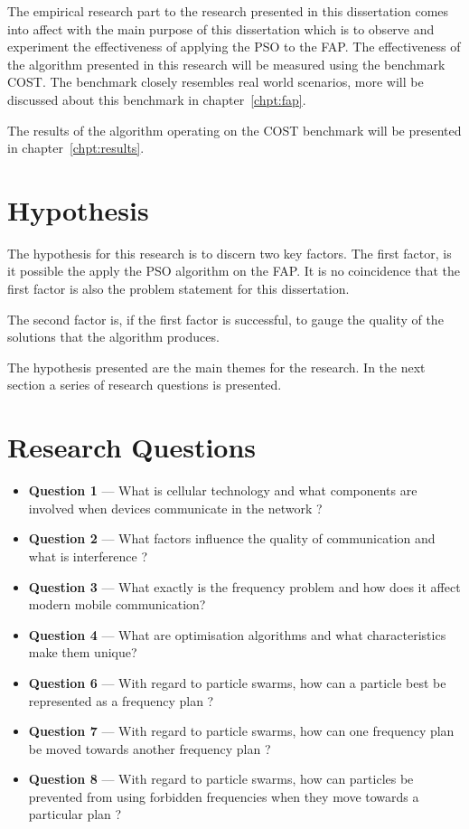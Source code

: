 The empirical research part to the research presented in this dissertation comes into affect with the main purpose of this dissertation which is to observe and experiment the effectiveness of applying the \gls{PSO} to the \gls{FAP}. The effectiveness of the algorithm presented in this research will be measured using the benchmark \gls{COST}. The benchmark closely resembles real world scenarios, more will be discussed about this benchmark in chapter~\ref{chpt:fap}.

The results of the algorithm operating on the \gls{COST} benchmark will be presented in chapter~\ref{chpt:results}. 
\section{Hypothesis}
The hypothesis for this research is to discern two key factors. The first factor, is it possible the apply the \gls{PSO} algorithm on the \gls{FAP}. It is no coincidence that the first factor is also the problem statement for this dissertation.

The second factor is, if the first factor is successful, to gauge the quality of the solutions that the algorithm produces.

The hypothesis presented are the main themes for the research. In the next section a series of research questions is presented.
\section{Research Questions}
\begin{itemize}
\item \textbf{Question 1} --- What is cellular technology and what components are involved when devices communicate in the network ?
\item \textbf{Question 2} --- What factors influence the quality of communication and what is interference ?
\item \textbf{Question 3} --- What exactly is the frequency problem and how does it affect modern mobile communication?
\item \textbf{Question 4} --- What are optimisation algorithms and what characteristics make them unique?
\item \textbf{Question 6} --- With regard to particle swarms, how can a particle best be represented as a frequency plan ?
\item \textbf{Question 7} --- With regard to particle swarms, how can one frequency plan be moved towards another frequency plan ?
\item \textbf{Question 8} --- With regard to particle swarms, how can particles be prevented from using forbidden frequencies when they move towards a particular plan ?
\end{itemize}

